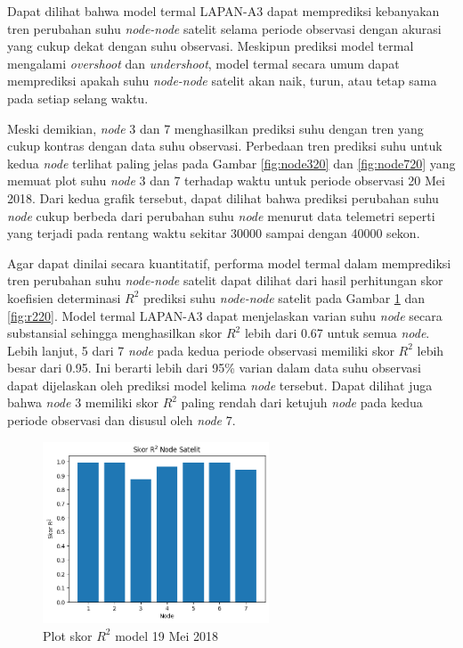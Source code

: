 Dapat dilihat bahwa model termal LAPAN-A3 dapat memprediksi kebanyakan tren
perubahan suhu \textit{node-node} satelit selama periode observasi dengan akurasi yang
cukup dekat dengan suhu observasi. Meskipun prediksi model termal mengalami
\textit{overshoot} dan \textit{undershoot}, model termal secara umum dapat
memprediksi apakah suhu \textit{node-node} satelit akan naik, turun, atau tetap sama
pada setiap selang waktu.

Meski demikian, \textit{node} 3 dan 7 menghasilkan prediksi suhu dengan tren
yang cukup kontras dengan data suhu observasi. Perbedaan tren prediksi suhu
untuk kedua \textit{node} terlihat paling jelas pada Gambar \ref{fig:node320}
dan \ref{fig:node720} yang memuat plot suhu \textit{node} 3 dan 7 terhadap
waktu untuk periode observasi 20 Mei 2018. Dari kedua grafik tersebut, dapat
dilihat bahwa prediksi perubahan suhu \textit{node} cukup berbeda dari
perubahan suhu \textit{node} menurut data telemetri seperti yang terjadi pada
rentang waktu sekitar 30000 sampai dengan 40000 sekon.

Agar dapat dinilai secara kuantitatif, performa model termal dalam memprediksi
tren perubahan suhu \textit{node-node} satelit dapat dilihat dari hasil
perhitungan skor koefisien determinasi $R^2$ prediksi suhu \textit{node-node}
satelit pada Gambar \ref{fig:r219} dan \ref{fig:r220}. Model termal LAPAN-A3
dapat menjelaskan varian suhu \textit{node} secara substansial sehingga
menghasilkan skor $R^2$ lebih dari 0.67 untuk semua \textit{node}. Lebih
lanjut, 5 dari 7 \textit{node} pada kedua periode observasi memiliki skor $R^2$
lebih besar dari 0.95. Ini berarti lebih dari 95\% varian dalam data suhu
observasi dapat dijelaskan oleh prediksi model kelima \textit{node} tersebut.
Dapat dilihat juga bahwa \textit{node} 3 memiliki skor $R^2$ paling rendah dari
ketujuh \textit{node} pada kedua periode observasi dan disusul oleh
\textit{node} 7.

\begin{figure}[H]
\setlength{}
\begin{center}
\includegraphics[width=0.6\textwidth]{fig/r2_2018-05-19.png}
\caption{Plot skor $R^2$ model 19 Mei 2018}
\label{fig:r219}
\end{center}
\end{figure}

